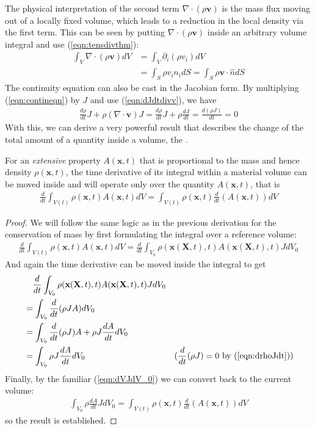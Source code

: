 The physical interpretation of the second term $\nabla \cdot(\rho\textbf{v})$ is the mass flux moving out of a locally fixed volume, which leads to a reduction in the local density via the first term. This can be seen by putting $\nabla \cdot(\rho\textbf{v})$ inside an arbitrary volume integral and use (\ref{eqn:tensdivthm}):
\begin{align}
\int_V \nabla \cdot(\rho\textbf{v}) dV &= \int_V \partial_i(\rho v_i) dV \nonumber \\
&= \int_S \rho v_i n_i dS = \int_S \rho\textbf{v} \cdot \hat{n} dS
\end{align}
The continuity equation can also be cast in the Jacobian form. By multiplying (\ref{eqn:contineqn}) by $J$ and use (\ref{eqn:dJdtdivv}), we have
\begin{align}
\frac{d\rho}{dt}J + \rho(\nabla \cdot \textbf{v})J = \frac{d\rho}{dt}J + \rho\frac{dJ}{dt} = \frac{d(\rho J)}{dt} = 0 \label{eqn:drhoJdt}
\end{align}
With this, we can derive a very powerful result that describes the change of the total amount of a quantity inside a volume, the .
\begin{thm}
\label{thm:RTT}
For an \textit{extensive} property $A(\textbf{x},t)$ that is proportional to the mass and hence density $\rho(\textbf{x},t)$, the time derivative of its integral within a material volume can be moved inside and will operate only over the quantity $A(\textbf{x},t)$, that is
\begin{align}
\frac{d}{dt} \int_{V(t)} \rho(\textbf{x},t)A(\textbf{x},t)dV = \int_{V(t)} \rho(\textbf{x},t)\frac{d}{dt}(A(\textbf{x},t))dV \label{eqn:RTT}
\end{align}
\end{thm}
\begin{proof}
We will follow the same logic as in the previous derivation for the conservation of mass by first formulating the integral over a reference volume:
\begin{align}
\frac{d}{dt} \int_{V(t)} \rho(\textbf{x},t)A(\textbf{x},t)dV = \frac{d}{dt} \int_{V_0} \rho(\textbf{x}(\textbf{X},t),t)A(\textbf{x}(\textbf{X},t),t)JdV_0  
\end{align}
And again the time derivative can be moved inside the integral to get
\begin{align}
&\quad \frac{d}{dt} \int_{V_0} \rho(\textbf{x}(\textbf{X},t),t)A(\textbf{x}(\textbf{X},t),t)JdV_0 \nonumber \\
&= \int_{V_0} \frac{d}{dt}(\rho J A) dV_0 \nonumber \\
&= \int_{V_0} \frac{d}{dt}(\rho J)A + \rho J\frac{dA}{dt} dV_0 \nonumber \\
&= \int_{V_0} \rho J\frac{dA}{dt} dV_0 & \text{($\frac{d}{dt}(\rho J) = 0$ by (\ref{eqn:drhoJdt}))}
\end{align}
Finally, by the familiar (\ref{eqn:dVJdV_0}) we can convert back to the current volume: 
\begin{align}
\int_{V_0} \rho \frac{dA}{dt} JdV_0 = \int_{V(t)} \rho(\textbf{x},t)\frac{d}{dt}(A(\textbf{x},t))dV 
\end{align}
so the result is established.
\end{proof}

